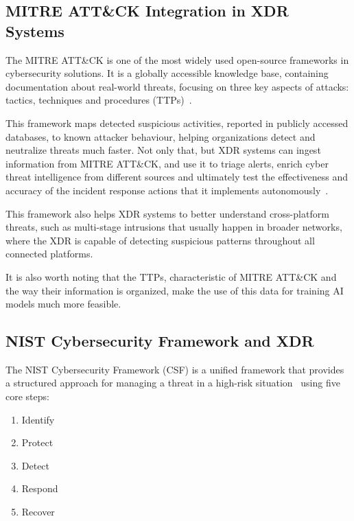 \documentclass[12pt,a4paper]{report}
\begin{document}
\subsection{MITRE ATT\&CK Integration in XDR Systems}

The MITRE ATT\&CK is one of the most widely used open-source frameworks in cybersecurity
solutions. It is a globally accessible knowledge base, containing documentation about real-world
threats, focusing on three key aspects of attacks: tactics, techniques and procedures
(TTPs)~\cite{ref31}.

This framework maps detected suspicious activities, reported in publicly accessed databases, to
known attacker behaviour, helping organizations detect and neutralize threats much faster. Not
only that, but XDR systems can ingest information from MITRE ATT\&CK, and use it to triage
alerts, enrich cyber threat intelligence from different sources and ultimately test the
effectiveness and accuracy of the incident response actions that it implements
autonomously~\cite{ref32}.

This framework also helps XDR systems to better understand cross-platform threats, such as
multi-stage intrusions that usually happen in broader networks, where the XDR is capable of
detecting suspicious patterns throughout all connected platforms.

It is also worth noting that the TTPs, characteristic of MITRE ATT\&CK and the way their
information is organized, make the use of this data for training AI models much more feasible.

\subsection{NIST Cybersecurity Framework and XDR}

The NIST Cybersecurity Framework (CSF) is a unified framework that provides a structured approach
for managing a threat in a high-risk situation~\cite{ref34} using five core steps:

\begin{enumerate}
  \item Identify
  \item Protect
  \item Detect
  \item Respond
  \item Recover
\end{enumerate}
\end{document}
